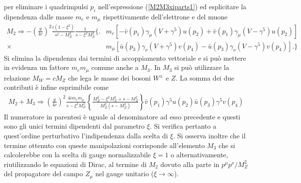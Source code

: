 \documentclass[11pt]{article}
\begin{document}
    per eliminare i quadrimpulsi $p_i$ nell'espressione (\ref{M2M3xiparts1}) ed esplicitare la dipendenza dalle masse $m_e$ e $m_\mu$ rispettivamente dell'elettrone e del muone
    \begin{equation}
    \begin{split}
    M_2\Rightarrow-\left(\frac{g}{4c}\right)^2 \frac{i(1-\xi^2)}{s^2-M_Z^2}\frac{1}{s-\xi^2 M_Z^2}\Big\{ \Big.&m_e[-\bar{v}(p_1)\gamma_\mu(V+\gamma^5)u(p_2)+\bar{v}(p_1)\gamma_\mu(V-\gamma^5)u(p_2)] \\
    \times &m_\mu[\bar{u}(p_3)\gamma_\nu(V+\gamma^5)v(p_4)-\bar{u}(p_3)\gamma_\nu(V-\gamma^5)v(p_4)]\Big. \Big\}
    \end{split}
    \end{equation}
    Si elimina la dipendenza dai termini di accoppiamento vettoriale e si può mettere in evidenza un fattore $m_em_\mu$ comune anche a $M_3$. In $M_3$ si può utilizzare la relazione $M_W=cM_Z$ che lega le masse dei bosoni $W^\pm$ e $Z$. La somma dei due contributi è infine
    esprimibile come
    \begin{equation}
    \begin{split}
    M_2+M_3\Rightarrow\left(\frac{g}{4c}\right)^2\frac{4im_e m_\mu}{s-\xi^2M_Z^2}\left\{\frac{M_Z^2-\xi^2M_Z^2+s-M_Z^2}{M_Z^2(s-M_Z^2)}\right\}\bar{v}(p_1)\gamma^5u(p_2)\bar{u}(p_3)\gamma^5v(p_4)
    \end{split}
    \end{equation}
    Il numeratore in parentesi è uguale al denominatore ad esso precedente e questi sono gli unici termini dipendenti dal parametro $\xi$. Si verifica pertanto a quest'ordine perturbativo l'indipendenza dalla scelta di $\xi$. Si osserva inoltre che
    il termine ottenuto con queste manipolazioni corrisponde all'elemento $M_3$ che si calcolerebbe con la scelta di gauge normalizzabile $\xi=1$ o alternativamente, riutilizzando le equazioni di Dirac, al termine di $M_2$ dovuto alla parte in
    $p^\mu p^\nu/M_Z^2$ del propagatore del campo $Z_\mu$ nel gauge unitario ($\xi\to\infty$).
\end{document}
